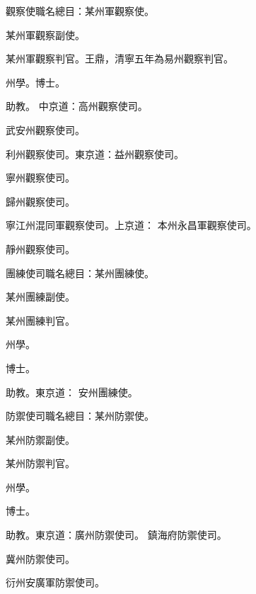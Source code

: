 \begin{pinyinscope}
 觀察使職名總目：某州軍觀察使。



 某州軍觀察副使。



 某州軍觀察判官。王鼎，清寧五年為易州觀察判官。



 州學。博士。



 助教。
 中京道：高州觀察使司。



 武安州觀察使司。



 利州觀察使司。東京道：益州觀察使司。



 寧州觀察使司。



 歸州觀察使司。



 寧江州混同軍觀察使司。上京道：
 本州永昌軍觀察使司。



 靜州觀察使司。



 團練使司職名總目：某州團練使。



 某州團練副使。



 某州團練判官。



 州學。



 博士。



 助教。東京道：
 安州團練使。



 防禦使司職名總目：某州防禦使。



 某州防禦副使。



 某州防禦判官。



 州學。



 博士。



 助教。東京道：廣州防禦使司。
 鎮海府防禦使司。



 冀州防禦使司。



 衍州安廣軍防禦使司。




\end{pinyinscope}
